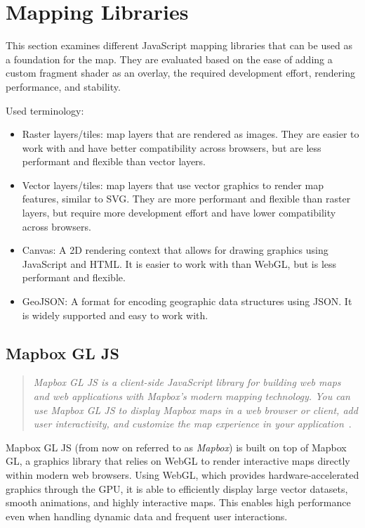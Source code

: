 \section{Mapping Libraries}

This section examines different JavaScript mapping libraries that can be used as a foundation for the map. They are evaluated based on the ease of adding a custom fragment shader as an overlay, the required development effort, rendering performance, and stability.

Used terminology:
\begin{itemize}
    \item Raster layers/tiles: map layers that are rendered as images. They are easier to work with and have better compatibility across browsers, but are less performant and flexible than vector layers.
    \item Vector layers/tiles: map layers that use vector graphics to render map features, similar to SVG\@. They are more performant and flexible than raster layers, but require more development effort and have lower compatibility across browsers.\ \cite{libs:tiles}
    \item Canvas: A 2D rendering context that allows for drawing graphics using JavaScript and HTML\@. It is easier to work with than WebGL, but is less performant and flexible.\\\cite{libs:canvas}
    \item GeoJSON\@: A format for encoding geographic data structures using JSON\@. It is widely supported and easy to work with.\ \cite{other:geojson}
\end{itemize}

\subsection{Mapbox GL JS}

\begin{quote}
    \textit{Mapbox GL JS is a client-side JavaScript library for building web maps and web applications with Mapbox's modern mapping technology. You can use Mapbox GL JS to display Mapbox maps in a web browser or client, add user interactivity, and customize the map experience in your application}\ \cite{libs:mapbox}.
\end{quote}

Mapbox GL JS (from now on referred to as \emph{Mapbox}) is built on top of Mapbox GL, a graphics library that relies on WebGL to render interactive maps directly within modern web browsers. Using WebGL, which provides hardware-accelerated graphics through the GPU, it is able to efficiently display large vector datasets, smooth animations, and highly interactive maps. This enables high performance even when handling dynamic data and frequent user interactions.

